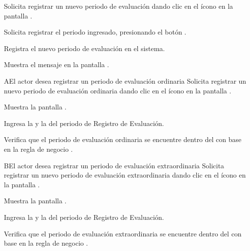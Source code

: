 \begin{UCtrayectoria}
	\UCpaso [\UCactor]  \label{IN-DAE-CU1.1:solicitar} Solicita registrar un nuevo periodo de evaluación dando clic en el ícono {\IUAdd} en la pantalla .    
	
	\UCpaso [\UCactor]  \label{IN-DAE-CU1.1:aceptar} Solicita registrar el periodo ingresado, presionando el botón .
	
	\UCpaso Registra el nuevo periodo de evaluación en el sistema.

	\UCpaso Muestra el mensaje  en la pantalla .
\end{UCtrayectoria}



\begin{UCtrayectoriaA}{A}{El actor desea registrar un periodo de evaluación ordinaria}
	\UCpaso [\UCactor]  \label{IN-DAE-CU1.1:solicitarA} Solicita registrar un nuevo periodo de evaluación ordinaria dando clic en el ícono {\IUAdd} en la pantalla .
	
	\UCpaso Muestra la pantalla .
	
	\UCpaso [\UCactor]  \label{IN-DAE-CU1.1:ingresarA} Ingresa la  y la  del periodo de Registro de Evaluación.
	
	\UCpaso Verifica que el periodo de evaluación ordinaria se encuentre dentro del  con base en la regla de negocio . 
	
\end{UCtrayectoriaA}


\begin{UCtrayectoriaA}{B}{El actor desea registrar un periodo de evaluación extraordinaria}
	\UCpaso [\UCactor]  \label{IN-DAE-CU1.1:solicitarB} Solicita registrar un nuevo periodo de evaluación extraordinaria dando clic en el ícono {\IUAdd} en la pantalla .
	
	\UCpaso Muestra la pantalla .
	
	\UCpaso [\UCactor]  \label{IN-DAE-CU1.1:ingresarB} Ingresa la  y la  del periodo de Registro de Evaluación.
	
	\UCpaso Verifica que el periodo de evaluación extraordinaria se encuentre dentro del  con base en la regla de negocio . 
	
\end{UCtrayectoriaA}

